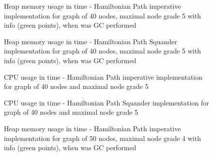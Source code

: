 \documentclass[11pt,twoside,a4paper]{book}
\begin{document}
\newpage


\begin{figure}
\begin{center}

\caption{Heap memory usage in time - Hamiltonian Path imperative implementation for
graph of 40 nodes, maximal node grade 5 with info (green points),
when was GC performed}
\label{fig:hpIMem405}
\end{center}
\end{figure}





\begin{figure}
\begin{center}

\caption{Heap memory usage in time - Hamiltonian Path Squander implementation for
graph of 40 nodes, maximal node grade 5 with info (green points),
when was GC performed}
\label{fig:hpSMem405}
\end{center}
\end{figure}


\begin{figure}
\begin{center}

\caption{CPU usage in time - Hamiltonian Path imperative implementation for graph
of 40 nodes and maximal node grade 5}
\label{fig:hpICpu405}
\end{center}
\end{figure}


\begin{figure}[ht]
\begin{center}

\caption{CPU usage in time - Hamiltonian Path Squander implementation for graph
of 40 nodes and maximal node grade 5}
\label{fig:hpSCpu405}
\end{center}
\end{figure}



\begin{figure}[ht]
\begin{center}

\caption{Heap memory usage in time - Hamiltonian Path imperative implementation for
graph of 50 nodes, maximal node grade 4 with info (green points),
when was GC performed}
\label{fig:hpIMem504}
\end{center}
\end{figure}
\end{document}
